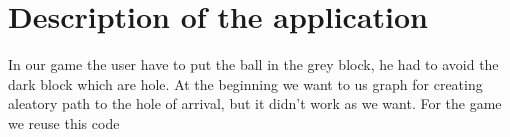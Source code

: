 \section{Description of the application}
In our game the user have to put the ball in the grey block, he had to avoid the dark block which are hole. At the beginning we want to us graph for creating aleatory path to the hole of arrival, but it didn't work as we want. For the game we reuse this code \cite{oc}